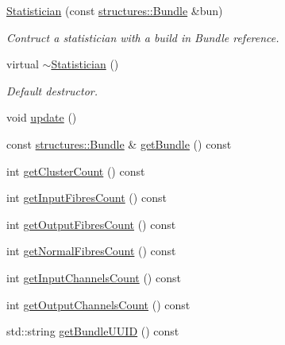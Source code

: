 \begin{DoxyCompactItemize}
\item 
\hyperlink{classcryomesh_1_1utilities_1_1Statistician_aa382bfde65efb16fa02b9c9d7d39a1b7}{\-Statistician} (const \hyperlink{classcryomesh_1_1structures_1_1Bundle}{structures\-::\-Bundle} \&bun)
\begin{DoxyCompactList}\small\item\em \-Contruct a statistician with a build in \-Bundle reference. \end{DoxyCompactList}\item 
virtual \hyperlink{classcryomesh_1_1utilities_1_1Statistician_afbba60713cc3a96c8659d155d6f9c853}{$\sim$\-Statistician} ()
\begin{DoxyCompactList}\small\item\em \-Default destructor. \end{DoxyCompactList}\item 
void \hyperlink{classcryomesh_1_1utilities_1_1Statistician_a3b6005b898ef77ca2fa2724f069b2c25}{update} ()
\item 
const \hyperlink{classcryomesh_1_1structures_1_1Bundle}{structures\-::\-Bundle} \& \hyperlink{classcryomesh_1_1utilities_1_1Statistician_a5ce2aab91e03121c69aa23209fbe9c97}{get\-Bundle} () const 
\item 
int \hyperlink{classcryomesh_1_1utilities_1_1Statistician_a64ee08e16f1f42fc518ce2d1255f353e}{get\-Cluster\-Count} () const 
\item 
int \hyperlink{classcryomesh_1_1utilities_1_1Statistician_a55bf105c419acad376e9aafeb135be71}{get\-Input\-Fibres\-Count} () const 
\item 
int \hyperlink{classcryomesh_1_1utilities_1_1Statistician_aac6a1aeec3987386f175cc771e3e7a3a}{get\-Output\-Fibres\-Count} () const 
\item 
int \hyperlink{classcryomesh_1_1utilities_1_1Statistician_a5545756c254e28b165c806ddb8eb6780}{get\-Normal\-Fibres\-Count} () const 
\item 
int \hyperlink{classcryomesh_1_1utilities_1_1Statistician_a49864c3951b6aa8e1a263449bd0a0daf}{get\-Input\-Channels\-Count} () const 
\item 
int \hyperlink{classcryomesh_1_1utilities_1_1Statistician_ae1aed7da3340cbd51d31318f92794f4d}{get\-Output\-Channels\-Count} () const 
\item 
std\-::string \hyperlink{classcryomesh_1_1utilities_1_1Statistician_ab0d4863ff8c1962e56dfbab4eabfb6cf}{get\-Bundle\-U\-U\-I\-D} () const 
\item 

\end{DoxyCompactItemize}
